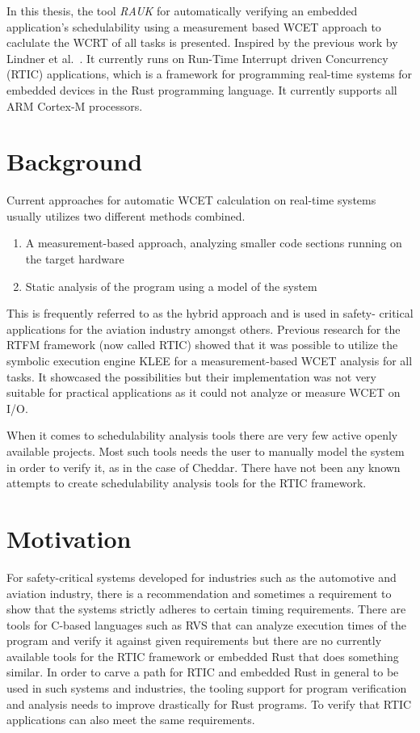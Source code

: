 In this thesis, the tool \emph{RAUK} for automatically verifying an embedded
application's schedulability using a measurement based WCET approach to
caclulate the WCRT of all tasks is presented. Inspired by the previous work by
Lindner et al.\ \cite{lindner}. It currently runs on Run-Time Interrupt driven
Concurrency (RTIC) applications, which is a framework for programming real-time
systems for embedded devices in the Rust programming language. It currently
supports all ARM Cortex-M processors.

\section{Background}
Current approaches for automatic WCET calculation on real-time systems usually
utilizes two different methods combined.
\begin{enumerate}
    \item A measurement-based approach, analyzing smaller code sections running
        on the target hardware
    \item Static analysis of the program using a model of the system
\end{enumerate}
This is frequently referred to as the hybrid approach and is used in safety-
critical applications for the aviation industry\cite{rapita} amongst others.
Previous research for the RTFM framework (now called RTIC) showed that it was
possible to utilize the symbolic execution engine KLEE for a measurement-based
WCET analysis for all tasks\cite{lindner}. It showcased the possibilities but
their implementation was not very suitable for practical applications as it
could not analyze or measure WCET on I/O.

When it comes to schedulability analysis tools there are very few active openly
available projects. Most such tools needs the user to manually model the system
in order to verify it, as in the case of Cheddar\cite{cheddar}. There have not
been any known attempts to create schedulability analysis tools for the RTIC
framework.

\section{Motivation}
For safety-critical systems developed for industries such as the automotive and
aviation industry, there is a recommendation and sometimes a requirement to
show that the systems strictly adheres to certain timing requirements. There
are tools for C-based languages such as RVS\cite{rapita} that can analyze
execution times of the program and verify it against given requirements but
there are no currently available tools for the RTIC framework or embedded Rust
that does something similar. In order to carve a path for RTIC and embedded
Rust in general to be used in such systems and industries, the tooling support
for program verification and analysis needs to improve drastically for Rust
programs. To verify that RTIC applications can also meet the same requirements.

